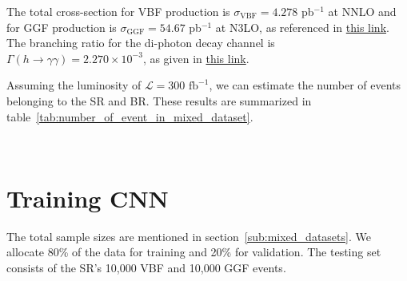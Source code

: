 \documentclass[12pt]{article}
\begin{document}
        The total cross-section for VBF production is $\sigma_{\text{VBF}} = 4.278$ pb$^{-1}$ at NNLO and for GGF production is $\sigma_{\text{GGF}} = 54.67$ pb$^{-1}$ at N3LO, as referenced in \href{https://twiki.cern.ch/twiki/bin/view/LHCPhysics/CERNYellowReportPageAt14TeV}{this link}. The branching ratio for the di-photon decay channel is $\Gamma\left( h \to \gamma\gamma \right) = 2.270 \times 10^{-3}$, as given in \href{https://twiki.cern.ch/twiki/bin/view/LHCPhysics/CERNYellowReportPageBR}{this link}.

        Assuming the luminosity of $\mathcal{L} = \text{300 fb}^{-1}$, we can estimate the number of events belonging to the SR and BR. These results are summarized in table~\ref{tab:number_of_event_in_mixed_dataset}.
        \begin{table}[htpb]
            \centering
            \caption{The number of events of mixed datasets under different selection cuts.}
            \label{tab:number_of_event_in_mixed_dataset}
             \\
        \end{table}
\section{Training CNN}%
\label{sec:training_cnn}
    The total sample sizes are mentioned in section~\ref{sub:mixed_datasets}. We allocate 80\% of the data for training and 20\% for validation. The testing set consists of the SR's 10,000 VBF and 10,000 GGF events.
\end{document}

